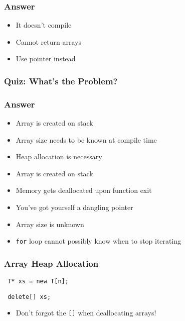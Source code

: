 \documentclass{../ucll-slides}
\begin{document}
\begin{frame}
  \frametitle{Answer}
  \Large
  \begin{itemize}
    \item It doesn't compile
    \item Cannot return arrays
    \item Use pointer instead
   \end{itemize}
\end{frame}

\begin{frame}
  \frametitle{Quiz: What's the Problem?}
\end{frame}

\begin{frame}
  \frametitle{Answer}
  \begin{itemize}
    \item Array is created on stack
    \item Array size needs to be known at compile time
    \item Heap allocation is necessary
  \end{itemize}
  \vskip5mm
  \begin{itemize}
    \item Array is created on stack
    \item Memory gets deallocated upon function exit
    \item You've got yourself a dangling pointer
  \end{itemize}
  \vskip5mm
  \begin{itemize}
    \item Array size is unknown
    \item {\tt for} loop cannot possibly know when to stop iterating
  \end{itemize}
\end{frame}

\begin{frame}
  \frametitle{Array Heap Allocation}
  \begin{center} \tt
    T* xs = new T[n];
  \end{center}
  \vskip5mm
  \begin{center} \tt
    delete[] xs;
  \end{center}
  \begin{itemize}
    \item Don't forgot the {\tt []} when deallocating arrays!
  \end{itemize}
\end{frame}
\end{document}

